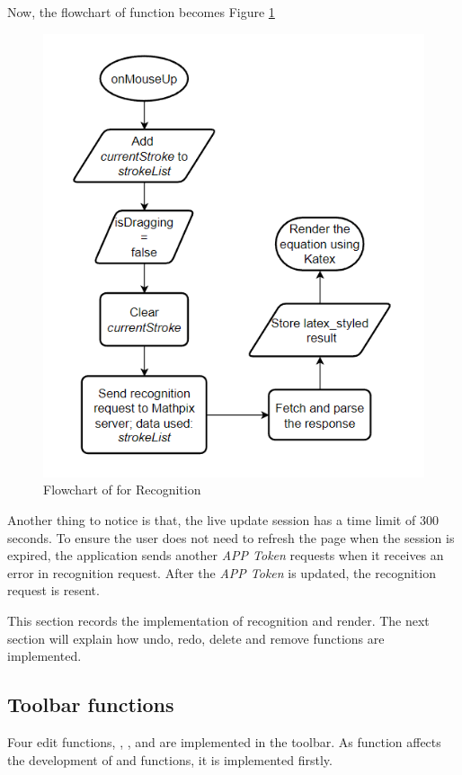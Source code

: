 \documentclass[12pt,twoside]{report}
\begin{document}
Now, the flowchart of function  becomes Figure \ref{fig:flowchart2}
\begin{figure}[h]
    \centering
    \includegraphics[width=0.6\linewidth]{figures/flowchart2.png}
    \caption{Flowchart of  for Recognition}
    \label{fig:flowchart2}
\end{figure}

Another thing to notice is that, the live update session has a time limit of 300 seconds. To ensure the user does not need to refresh the page when the session is expired, the application sends another \textit{APP Token} requests when it receives an  error in recognition request. After the \textit{APP Token} is updated, the recognition request is resent.

This section records the implementation of recognition and render. The next section will explain how undo, redo, delete and remove functions are implemented.

\subsection{Toolbar functions}
Four edit functions, , ,  and  are implemented in the toolbar. As  function affects the development of  and  functions, it is implemented firstly.
\end{document}
